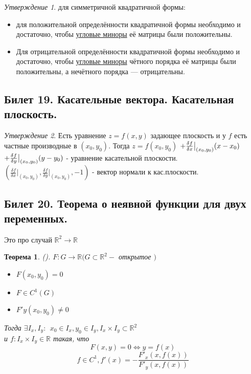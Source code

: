 \documentclass[a4paper]{article}
\theoremstyle{indented}
\newtheorem{theorem}{Теорема}
\theoremstyle{definition}
\theoremstyle{remark}
\newtheorem{stat}{Утверждение}
\begin{document}
\begin{stat}
     для симметричной квадратичной формы:
    \begin{itemize}
        \item для положительной определённости квадратичной формы необходимо и достаточно, чтобы \href{https://ru.wikipedia.org/wiki/%D0%9C%D0%B8%D0%BD%D0%BE%D1%80_(%D0%BB%D0%B8%D0%BD%D0%B5%D0%B9%D0%BD%D0%B0%D1%8F_%D0%B0%D0%BB%D0%B3%D0%B5%D0%B1%D1%80%D0%B0)}
        {угловые миноры} её матрицы были положительны.
        \item Для отрицательной определённости квадратичной формы необходимо и достаточно, чтобы \href{https://ru.wikipedia.org/wiki/%D0%9C%D0%B8%D0%BD%D0%BE%D1%80_(%D0%BB%D0%B8%D0%BD%D0%B5%D0%B9%D0%BD%D0%B0%D1%8F_%D0%B0%D0%BB%D0%B3%D0%B5%D0%B1%D1%80%D0%B0)}
        {угловые миноры} чётного порядка её матрицы были положительны, а нечётного порядка — отрицательны.
    \end{itemize}
\end{stat}

\subsection{Билет 19. Касательные вектора. Касательная плоскость.}


\begin{stat}
    Есть уравнение $z=f(x,y)$ задающее плоскость и у $f$ есть частные производные в 
    $(x_0, y_0)$. 
    Тогда $z=f(x_0,y_0)$
    $+\frac{\delta f}{\delta x}\big|_{(x_0,y_0)}(x-x_0)$
    $+\frac{\delta f}{\delta y}\big|_{(x_0,y_0)}(y-y_0)$ - уравнение касательной плоскости.
    $(\frac{\delta f}{\delta x}\big|_{(x_0,y_0)}, \frac{\delta f}{\delta y}\big|_{(x_0,y_0)}, -1)$ - вектор нормали к кас.плоскости.
\end{stat}
\subsection{Билет 20. Теорема о неявной функции для двух переменных.}%


Это про случай $\mathbb{R}^2 \to \mathbb{R}$


\begin{theorem} ().
    $F: G\to \mathbb{R} (G\subset \mathbb{R}^2 - $ открытое $)$
    \begin{itemize}
        \item $F(x_0, y_0) = 0$
        \item $F \in C^1(G)$
        \item $F'y(x_0, y_0) \not= 0$
    \end{itemize} 
    Тогда $\exists I_x, I_y: \ \ x_0\in I_x, y_0 \in I_y, I_x\times I_y \subset \mathbb{R}^2$\\
    и $f: I_x\times I_y \in \mathbb{R}$ такая, что 
    $$F(x,y)=0 \Leftrightarrow y=f(x)$$
    $$f\in C^1, f'(x)=-\frac{F'_x(x,f(x))}{F'_y(x,f(x))}$$
\end{theorem}
\end{document}
